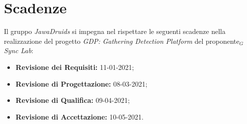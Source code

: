 \section{Scadenze} \label{IntroduzioneScadenze}
Il gruppo \textit{JawaDruids} si impegna nel rispettare le seguenti scadenze nella realizzazione del progetto \textit{GDP: Gathering Detection Platform} del proponente$_G$ \textit{Sync Lab}:
\begin{itemize}
	\item \textbf{Revisione dei Requisiti:} 11-01-2021;
	\item \textbf{Revisione di Progettazione:} 08-03-2021;
	\item \textbf{Revisione di Qualifica:} 09-04-2021;
	\item \textbf{Revisione di Accettazione:} 10-05-2021.
\end{itemize}
